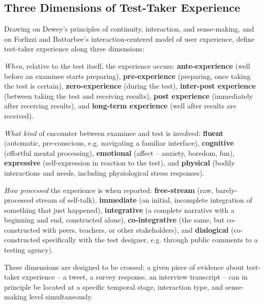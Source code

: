 \documentclass[11pt]{article}
\begin{document}
\subsection{Three Dimensions of Test-Taker Experience}

Drawing on Dewey's \citeyearpar{dewey1938} principles of continuity, interaction, and sense-making, and on Forlizzi and Battarbee's \citeyearpar{forlizzi2004} interaction-centered model of user experience, \citet{araneda2025ttxmodel} define test-taker experience along three dimensions:

\begin{description}[leftmargin=3.6cm, style=nextline]
    \item[Temporal stage] \emph{When}, relative to the test itself, the experience occurs: \textbf{ante-experience} (well before an examinee starts preparing), \textbf{pre-experience} (preparing, once taking the test is certain), \textbf{zero-experience} (during the test), \textbf{inter-post experience} (between taking the test and receiving results), \textbf{post experience} (immediately after receiving results), and \textbf{long-term experience} (well after results are received).
    \item[Type of interaction] \emph{What kind} of encounter between examinee and test is involved: \textbf{fluent} (automatic, pre-conscious, e.g. navigating a familiar interface), \textbf{cognitive} (effortful mental processing), \textbf{emotional} (affect -- anxiety, boredom, fun), \textbf{expressive} (self-expression in reaction to the test), and \textbf{physical} (bodily interactions and needs, including physiological stress responses).
    \item[Level of sense-making] \emph{How processed} the experience is when reported: \textbf{free-stream} (raw, barely-processed stream of self-talk), \textbf{immediate} (an initial, incomplete integration of something that just happened), \textbf{integrative} (a complete narrative with a beginning and end, constructed alone), \textbf{co-integrative} (the same, but co-constructed with peers, teachers, or other stakeholders), and \textbf{dialogical} (co-constructed specifically with the test designer, e.g. through public comments to a testing agency).
\end{description}

These dimensions are designed to be crossed: a given piece of evidence about test-taker experience -- a tweet, a survey response, an interview transcript -- can in principle be located at a specific temporal stage, interaction type, and sense-making level simultaneously.
\end{document}
